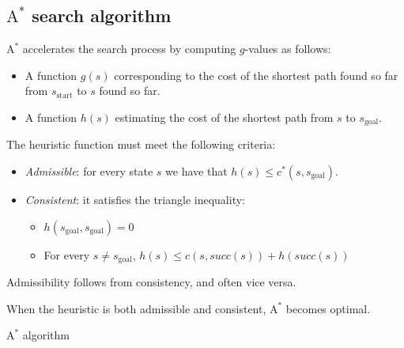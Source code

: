 \subsection*{$\text{A}^\ast$ search algorithm}
$\text{A}^\ast$ accelerates the search process by computing $g$-values as follows:
\begin{itemize}
    \item A function $g(s)$ corresponding to the cost of the shortest path found so far from $s_{\text{start}}$ to $s$ found so far.
    \item A function $h(s)$ estimating the cost of the shortest path from $s$ to $s_{\text{goal}}$. 
\end{itemize}
The heuristic function must meet the following criteria:
\begin{itemize}
    \item \textit{Admissible}: for every state $s$ we have that $h(s)\leq c^{\ast}(s,s_{\text{goal}})$. 
    \item \textit{Consistent}: it satisfies the triangle inequality:
        \begin{itemize}
            \item $h(s_{\text{goal}},s_{\text{goal}}) = 0$
            \item For every $s\neq s_{\text{goal}}$, $h(s) \leq c(s,succ(s)) + h(succ(s))$
        \end{itemize}
\end{itemize}
Admissibility follows from consistency, and often vice versa.
\begin{property}
    When the heuristic is both admissible and consistent, $\text{A}^\ast$ becomes optimal.
\end{property}

\begin{algorithm}[H]
    \caption{$\text{A}^\ast$ algorithm}
        \begin{algorithmic}[1]
                    \EndIf
                \EndFor 
            \EndWhile
        \end{algorithmic}
\end{algorithm}

